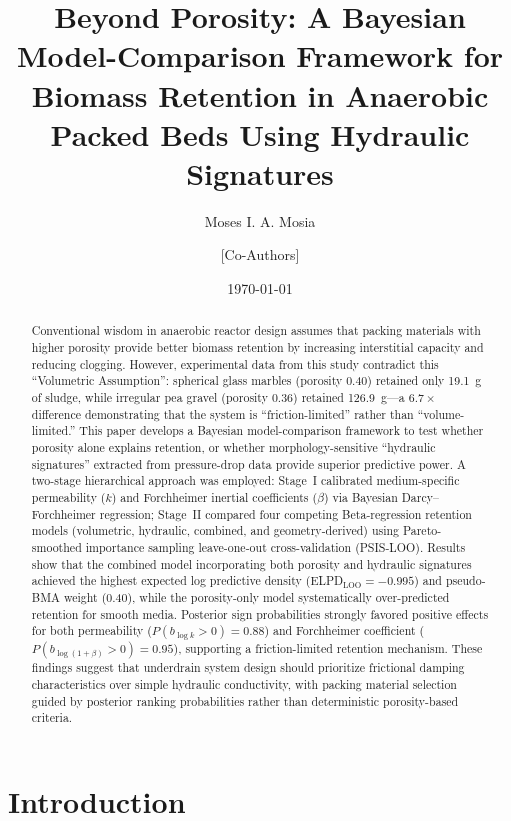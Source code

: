 \documentclass[12pt,a4paper]{article}
\title{Beyond Porosity: A Bayesian Model-Comparison Framework for Biomass Retention in Anaerobic Packed Beds Using Hydraulic Signatures}
\author{Moses I. A. Mosia \and [Co-Authors]}
\date{\today}
\begin{document}
\maketitle

\begin{abstract}
Conventional wisdom in anaerobic reactor design assumes that packing materials with higher porosity provide better biomass retention by increasing interstitial capacity and reducing clogging. However, experimental data from this study contradict this ``Volumetric Assumption'': spherical glass marbles (porosity 0.40) retained only 19.1~g of sludge, while irregular pea gravel (porosity 0.36) retained 126.9~g---a $6.7\times$ difference demonstrating that the system is ``friction-limited'' rather than ``volume-limited.'' This paper develops a Bayesian model-comparison framework to test whether porosity alone explains retention, or whether morphology-sensitive ``hydraulic signatures'' extracted from pressure-drop data provide superior predictive power. A two-stage hierarchical approach was employed: Stage~I calibrated medium-specific permeability ($k$) and Forchheimer inertial coefficients ($\beta$) via Bayesian Darcy--Forchheimer regression; Stage~II compared four competing Beta-regression retention models (volumetric, hydraulic, combined, and geometry-derived) using Pareto-smoothed importance sampling leave-one-out cross-validation (PSIS-LOO). Results show that the combined model incorporating both porosity and hydraulic signatures achieved the highest expected log predictive density (ELPD$_{\mathrm{LOO}}=-0.995$) and pseudo-BMA weight (0.40), while the porosity-only model systematically over-predicted retention for smooth media. Posterior sign probabilities strongly favored positive effects for both permeability ($P(b_{\log k}>0)=0.88$) and Forchheimer coefficient ($P(b_{\log(1+\beta)}>0)=0.95$), supporting a friction-limited retention mechanism. These findings suggest that underdrain system design should prioritize frictional damping characteristics over simple hydraulic conductivity, with packing material selection guided by posterior ranking probabilities rather than deterministic porosity-based criteria.
\end{abstract}

\section{Introduction}
\end{document}

